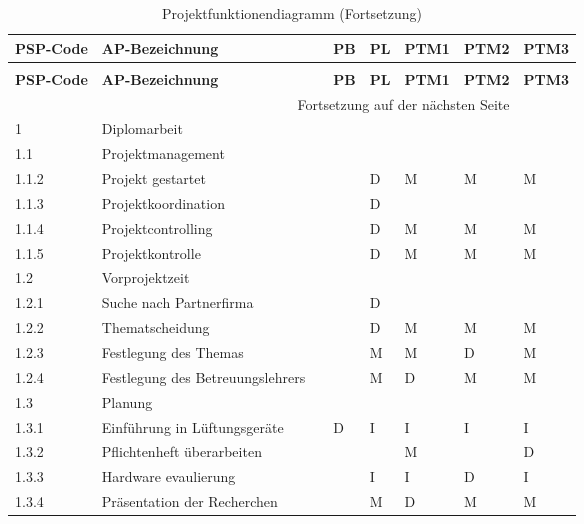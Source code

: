 \newpage
\begin{longtable}{p{} p{} p{} p{}  p{} p{} p{} p{}}
	\caption{Projektfunktionendiagramm}
	\label{tab:funktionendiagramm}
	\\ \toprule
	\textbf{PSP-Code} & \textbf{AP-Bezeichnung} & & \textbf{PB} & \textbf{PL} & \textbf{PTM1} & \textbf{PTM2} & \textbf{PTM3}
	\\ \midrule
	\endfirsthead
	\caption{Projektfunktionendiagramm (Fortsetzung)}
	\\ \toprule
	\textbf{PSP-Code} & \textbf{AP-Bezeichnung} & & \textbf{PB} & \textbf{PL} & \textbf{PTM1} & \textbf{PTM2} & \textbf{PTM3}
	\\ \midrule
	\endhead
	\midrule
	\multicolumn{7}{r}{{Fortsetzung auf  der nächsten Seite}} 
	\\ \bottomrule
	\endfoot
	\bottomrule
	\endlastfoot
	\rowcolor{mygray} 1 & Diplomarbeit & & & & & & \\ \midrule
	\rowcolor{mygray2}1.1 & Projektmanagement & & & & & &\\ \midrule
	1.1.2 & Projekt gestartet & & & D & M & M & M \\ \midrule
	1.1.3 & Projektkoordination & & & D & & & \\ \midrule
	1.1.4 & Projektcontrolling & & & D & M & M & M \\ \midrule
	1.1.5 & Projektkontrolle & & & D & M & M & M \\ \midrule
	\rowcolor{mygray2}1.2 & Vorprojektzeit & & & & & & \\ \midrule
	1.2.1 & Suche nach Partnerfirma & & & D & & & \\ \midrule
	1.2.2 & Thematscheidung & & & D & M & M & M \\ \midrule
	1.2.3 & Festlegung des Themas & & & M & M & D & M \\ \midrule
	1.2.4 & Festlegung des Betreuungslehrers & & & M & D & M & M \\ \midrule
	\rowcolor{mygray2}1.3 & Planung & & & & & & \\ \midrule
	1.3.1 & Einführung in Lüftungsgeräte & & D & I & I & I & I \\ \midrule
	1.3.2 & Pflichtenheft überarbeiten & & & & M & & D \\ \midrule
	1.3.3 & Hardware evaulierung & & & I & I & D & I \\ \midrule
	1.3.4 & Präsentation der Recherchen & & & M & D & M & M \\ \midrule

\end{longtable}
